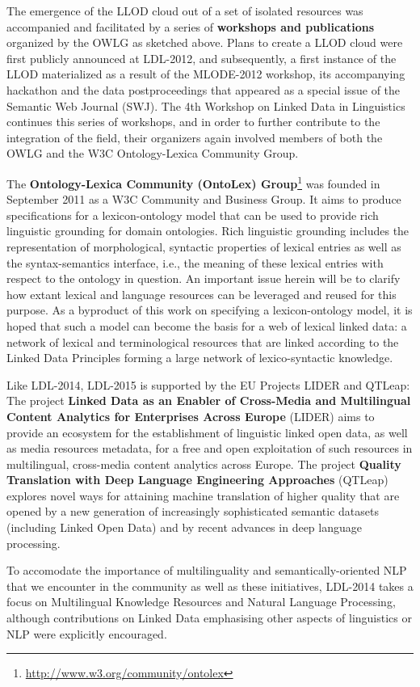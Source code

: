 The emergence of the LLOD cloud out of a set of isolated resources was accompanied and facilitated by a series of \textbf{workshops and publications} organized by the OWLG as sketched above. 
Plans to create a LLOD cloud were first publicly announced at LDL-2012, and subsequently, a first instance of the LLOD materialized as a result of the MLODE-2012 workshop, its accompanying hackathon and the data postproceedings that appeared as a special issue of the Semantic Web Journal (SWJ). 
The 4th Workshop on Linked Data in Linguistics continues this series of workshops, and in order to further contribute to the integration of the field, their organizers again involved members of both the OWLG and the W3C Ontology-Lexica Community Group.

The \textbf{Ontology-Lexica Community (OntoLex) Group}\footnote{\url{http://www.w3.org/community/ontolex}} was founded  in September 2011 as a W3C Community and Business Group. It aims to produce specifications for a lexicon-ontology model that can be used to provide rich linguistic grounding for domain ontologies.
Rich linguistic grounding includes the representation of morphological, syntactic properties of lexical entries as well as the syntax-semantics interface, i.e., the meaning of these lexical entries with respect to the ontology in question. An important issue herein will be to clarify how extant lexical and language resources can be leveraged and reused for this purpose. As a byproduct of this work on specifying a lexicon-ontology model, it is hoped that such a model can become the basis for a web of lexical linked data: a network of lexical and terminological resources that are linked according to the Linked Data Principles forming a large network of lexico-syntactic knowledge.

Like LDL-2014, LDL-2015 is supported by the EU Projects LIDER and QTLeap:
The project \textbf{Linked Data as an Enabler of Cross-Media and Multilingual Content Analytics for Enterprises Across Europe} (LIDER) aims to provide an 
ecosystem for the establishment of linguistic linked open data, as well as media resources metadata, for a free and open exploitation of such resources in 
multilingual, cross-media content analytics across Europe. 
The project \textbf{Quality Translation with Deep Language Engineering Approaches} (QTLeap) explores novel ways for attaining machine translation of higher quality that are opened by a new generation of increasingly sophisticated semantic datasets (including Linked Open Data) and by recent advances in deep language processing.

To accomodate the importance of multilinguality and semantically-oriented NLP that we encounter in the community as well as these initiatives, LDL-2014 takes a focus on Multilingual Knowledge Resources and Natural Language Processing, although contributions on Linked Data emphasising other aspects of linguistics or NLP were explicitly encouraged.